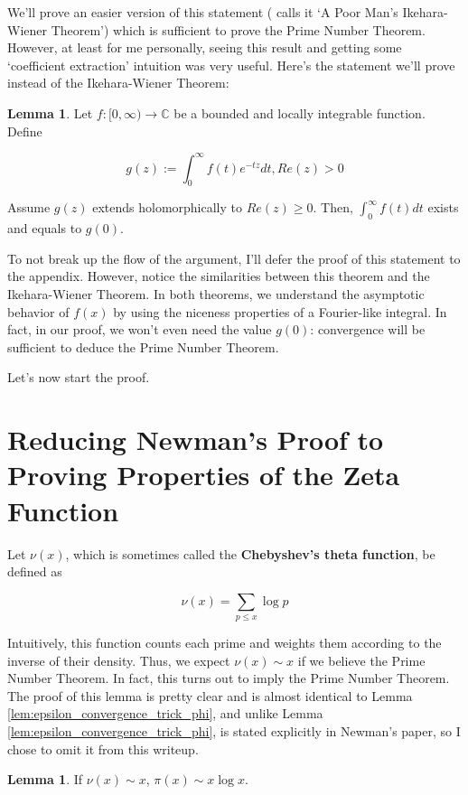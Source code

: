\documentclass{article}
\theoremstyle{definition}
\newtheorem{lemma}[theorem]{Lemma}
\newcommand{\C}{\mathbb{C}}
\begin{document}
We'll prove an easier version of this statement (\cite{korevaar_newmans_1982} calls it `A Poor Man's Ikehara-Wiener Theorem')
which is sufficient to prove the Prime Number Theorem. However, at least for me personally, seeing this result
and getting some `coefficient extraction' intuition was very useful. 
Here's the statement we'll prove instead of the Ikehara-Wiener Theorem:

\begin{lemma}
    Let $ f:[0,\infty) \xrightarrow{} \C$ be a bounded and locally integrable function.
    Define 

    \[ g(z) := \int_{0}^{\infty} f(t) e^{-tz} dt, Re(z) > 0 \]

    Assume $ g(z) $ extends holomorphically to $ Re(z) \geq 0 $.
    Then, $ \int_{0}^{\infty} f(t) dt $ exists and equals to $ g(0) $.
\end{lemma}

To not break up the flow of the argument, I'll defer the proof of this statement to the appendix.
However, notice the similarities between this theorem and the Ikehara-Wiener Theorem.
In both theorems, we understand the asymptotic behavior of $ f(x) $ by using the
niceness properties of a Fourier-like integral. In fact, in our proof, we won't even need
the value $ g(0) $: convergence will be sufficient to deduce the Prime Number Theorem.

Let's now start the proof.

\section{Reducing Newman's Proof to Proving Properties of the Zeta Function}

Let $ \nu(x) $, which is sometimes called the \textbf{Chebyshev's theta function},
be defined as 

\[ \nu(x) = \sum_{p \leq x} \log p \]

Intuitively, this function
counts each prime and weights them according to the inverse of their density.
Thus, we expect $ \nu(x) \sim x $ if we believe the Prime Number Theorem.
In fact, this turns out to imply the Prime Number Theorem. The proof of this
lemma is pretty clear and is almost identical to Lemma \ref{lem:epsilon_convergence_trick_phi},
and unlike Lemma \ref{lem:epsilon_convergence_trick_phi}, is stated explicitly
in Newman's paper, so I chose to omit it from this writeup.

\begin{lemma}
    If $ \nu(x) \sim x $, $ \pi(x) \sim x \log x $.
\end{lemma}
\end{document}
